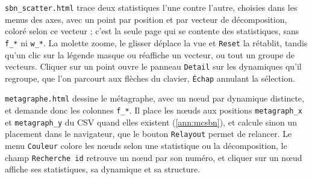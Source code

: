 \texttt{sbn\_scatter.html} trace deux statistiques l'une contre l'autre, choisies dans les menus des axes, avec un point par position et par vecteur de décomposition, coloré selon ce vecteur ; c'est la seule page qui se contente des statistiques, sans \texttt{f\_*} ni \texttt{w\_*}.
La molette zoome, le glisser déplace la vue et \texttt{Reset} la rétablit, tandis qu'un clic sur la légende masque ou réaffiche un vecteur, ou tout un groupe de vecteurs.
Cliquer sur un point ouvre le panneau \texttt{Detail} sur les dynamiques qu'il regroupe, que l'on parcourt aux flèches du clavier, \texttt{Échap} annulant la sélection.

\texttt{metagraphe.html} dessine le métagraphe, avec un nœud par dynamique distincte, et demande donc les colonnes \texttt{f\_*}.
Il place les nœuds aux positions \texttt{metagraph\_x} et \texttt{metagraph\_y} du CSV quand elles existent (\cref{ann:mcsbn}), et calcule sinon un placement dans le navigateur, que le bouton \texttt{Relayout} permet de relancer.
Le menu \texttt{Couleur} colore les nœuds selon une statistique ou la décomposition, le champ \texttt{Recherche id} retrouve un nœud par son numéro, et cliquer sur un nœud affiche ses statistiques, sa dynamique et sa structure.
